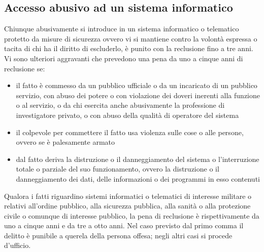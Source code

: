 \subsection{Accesso abusivo ad un sistema informatico}
Chiunque abusivamente si introduce in un sistema informatico o telematico
protetto da misure di sicurezza ovvero vi si mantiene contro la volontà
espressa o tacita di chi ha il diritto di escluderlo, è punito con la
reclusione fino a tre anni.
Vi sono ulteriori aggravanti che prevedono una pena da uno a cinque anni di reclusione se:
\begin{itemize}
    \item il fatto è commesso da un pubblico ufficiale o da un incaricato di un
        pubblico servizio, con abuso dei potere o con violazione dei doveri
        inerenti alla funzione o al servizio, o da chi esercita anche
        abusivamente la professione di investigatore privato, o con abuso della
        qualità di operatore del sistema 
    \item il colpevole per commettere il fatto usa violenza sulle cose o alle
        persone, ovvero se è palesamente armato
    \item dal fatto deriva la distruzione o il danneggiamento del sistema o
        l'interruzione totale o parziale del suo funzionamento, ovvero la
        distruzione o il danneggiamento dei dati, delle informazioni o dei
        programmi in esso contenuti
\end{itemize}
Qualora i fatti riguardino sistemi informatici o telematici di interesse
militare o relativi all'ordine pubblico, alla sicurezza pubblica, alla sanità o
alla protezione civile o comunque di interesse pubblico, la pena di reclusione
è rispettivamente da uno a cinque anni e da tre a otto anni.
\newline
Nel caso previsto dal primo comma il delitto è punibile a querela della persona
offesa; negli altri casi si procede d'ufficio.

